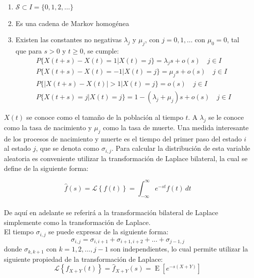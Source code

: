 \documentclass[11pt]{article}
\numberwithin{equation}{section} %
\providecommand{\DIFadd}[1]{{\protect\color{blue}\uwave{#1}}} %
\providecommand{\DIFdel}[1]{{\protect\color{red}\sout{#1}}}                      %
\providecommand{\DIFaddbegin}{} %
\providecommand{\DIFaddend}{} %
\providecommand{\DIFdelbegin}{} %
\providecommand{\DIFdelend}{} %
\begin{document}
\begin{enumerate}
  \item \DIFdelbegin \DIFdel{$\mathcal{S} \subset I = \{ 0,1,2,\ldots\}$
  }\DIFdelend \DIFaddbegin \DIFadd{$\mathcal{S} \subset \mathbb{N}$
  }\DIFaddend \item Es una cadena de Markov homogénea
  \item Existen las constantes no negativas $\lambda_j$ y $\mu_j$, con $j=0,1,\ldots$ con $\mu_0=0$, tal que para $s>0$ y $t\geq 0$, se cumple:
\begin{subequations}
\begin{eqnarray}
P\{X(t+s)-X(t)=1|X(t)=j\} = \lambda_j s + o(s)\quad j \in I \\
P\{X(t+s)-X(t)=-1|X(t)=j\} = \mu_js + o(s)\quad j \in I \\
P\{\left|X(t+s)-X(t)\right|>1|X(t)=j\} = o(s)\quad j \in I \\
P\{X(t+s)=j|X(t)=j\} = 1-(\lambda_j+\mu_j)s + o(s)\quad j \in I 
\end{eqnarray}
\end{subequations}
\end{enumerate}


$X(t)$ se conoce como el tamaño de la población al tiempo $t$. A $\lambda_j$ se le conoce como la tasa de nacimiento y $\mu_j$ como la tasa de muerte. Una medida interesante de los procesos de nacimiento y muerte es el tiempo del primer paso del estado $i$ al estado $j$, que se denota como $\sigma_{i,j}$. Para calcular la distribución de esta variable aleatoria es conveniente utilizar la transformación de Laplace bilateral, la cual se define de la siguiente forma:

\begin{equation}
\hat{f}(s) = \mathcal{L} \left\{f(t)\right\}=\int_{-\infty}^{\infty} e^{-st} f(t) \,dt
\end{equation}\\

De aquí en adelante se referirá a la transformación bilateral de Laplace simplemente como la transformación de Laplace.\\

El tiempo $\sigma_{i,j}$ se puede expresar de la siguiente forma:
\begin{equation}
\sigma_{i,j}=\sigma_{i,i+1}+\sigma_{i+1,i+2}+\ldots+\sigma_{j-1,j}
\end{equation}
donde $\sigma_{k,k+1}$ con $k=1,2,\ldots,j-1$ son independientes, lo cual permite utilizar la siguiente propiedad de la transformación de Laplace:
\begin{equation}
\mathcal{L} \left\{f_{X+Y}(t)\right\}=\hat{f}_{X+Y}(s)=\operatorname{E}[e^{-s(X+Y)}]
\end{equation}
\end{document}
